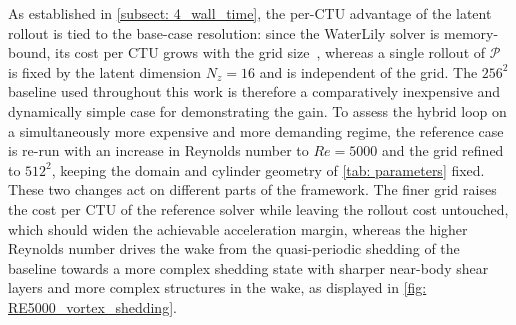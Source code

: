As established in \autoref{subsect: 4_wall_time}, the per-CTU advantage of the latent rollout is tied to the base-case resolution: since the WaterLily solver is memory-bound, its cost per CTU grows with the grid size~\cite{Weymouth2025}, whereas a single rollout of $\mathcal{P}$ is fixed by the latent dimension $N_z = 16$ and is independent of the grid. The $256^2$ baseline used throughout this work is therefore a comparatively inexpensive and dynamically simple case for demonstrating the gain. To assess the hybrid loop on a simultaneously more expensive and more demanding regime, the reference case is re-run with an increase in Reynolds number to $Re = 5000$ and the grid refined to $512^2$, keeping the domain and cylinder geometry of \autoref{tab: parameters} fixed. These two changes act on different parts of the framework. The finer grid raises the cost per CTU of the reference solver while leaving the rollout cost untouched, which should widen the achievable acceleration margin, whereas the higher Reynolds number drives the wake from the quasi-periodic shedding of the baseline towards a more complex shedding state with sharper near-body shear layers and more complex structures in the wake, as displayed in \autoref{fig: RE5000_vortex_shedding}. 



